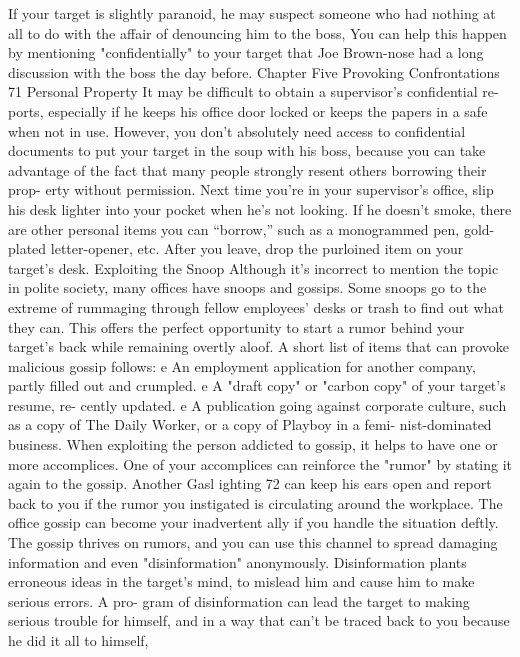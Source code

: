 \documentclass{book}
\begin{document}
If your target is slightly paranoid, he may suspect someone 
who had nothing at all to do with the affair of denouncing him 
to the boss, You can help this happen by mentioning 
"confidentially" to your target that Joe Brown-nose had a long 
discussion with the boss the day before. 
Chapter Five 
Provoking Confrontations 
71 
Personal Property 
It may be difficult to obtain a supervisor's confidential re- 
ports, especially if he keeps his office door locked or keeps the 
papers in a safe when not in use. However, you don't absolutely 
need access to confidential documents to put your target in the 
soup with his boss, because you can take advantage of the fact 
that many people strongly resent others borrowing their prop- 
erty without permission. 
Next time you're in your supervisor's office, slip his desk 
lighter into your pocket when he's not looking. If he doesn't 
smoke, there are other personal items you can “borrow,” such as 
a monogrammed pen, gold-plated letter-opener, etc. After you 
leave, drop the purloined item on your target's desk. 
Exploiting the Snoop 
Although it's incorrect to mention the topic in polite society, 
many offices have snoops and gossips. Some snoops go to the 
extreme of rummaging through fellow employees’ desks or trash 
to find out what they can. This offers the perfect opportunity to 
start a rumor behind your target's back while remaining overtly 
aloof. A short list of items that can provoke malicious gossip 
follows: 
e An employment application for another company, partly 
filled out and crumpled. 
e A "draft copy" or "carbon copy" of your target's resume, re- 
cently updated. 
e A publication going against corporate culture, such as a 
copy of The Daily Worker, or a copy of Playboy in a femi- 
nist-dominated business. 
When exploiting the person addicted to gossip, it helps to 
have one or more accomplices. One of your accomplices can 
reinforce the "rumor" by stating it again to the gossip. Another    
Gasl ighting 
72 
can keep his ears open and report back to you if the rumor you 
instigated is circulating around the workplace. 
The office gossip can become your inadvertent ally if you 
handle the situation deftly. The gossip thrives on rumors, and 
you can use this channel to spread damaging information and 
even "disinformation" anonymously. 
Disinformation plants erroneous ideas in the target's mind, 
to mislead him and cause him to make serious errors. A pro- 
gram of disinformation can lead the target to making serious 
trouble for himself, and in a way that can't be traced back to 
you because he did it all to himself, 
\end{document}
